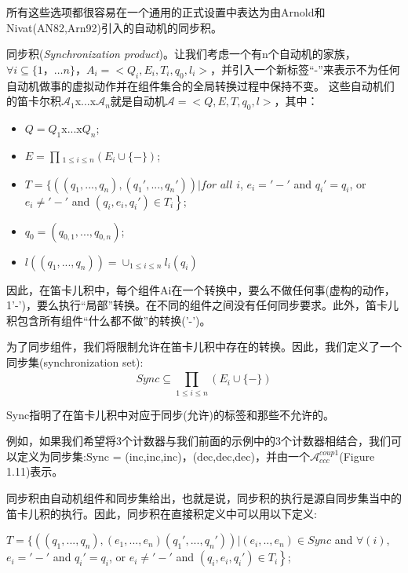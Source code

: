 \documentclass{book}
\begin{document}
    所有这些选项都很容易在一个通用的正式设置中表达为由Arnold和Nivat(AN82,Arn92)引入的自动机的同步积。

    同步积({\itshape Synchronization product})。让我们考虑一个有n个自动机的家族，$\forall{i}\subseteq\{ 1，…n\}$，$ A_i=<Q_i, E_i, T_i, q_0, l_i>$，并引入一个新标签“-”来表示不为任何自动机做事的虚拟动作并在组件集合的全局转换过程中保持不变。
    这些自动机们的笛卡尔积$\mathcal{A}_1$x...x$\mathcal{A}_n$就是自动机$\mathcal{A} =<Q,E,T,q_0,l>$，其中：
    \begin{itemize}
      \item $Q=Q_1$x...x$Q_n$;
      \item $E=\prod_{}{}_{1\leq i \leq n}(E_i\cup\{-\})$;
      \item $T=\left.\{ ((q_1,...,q_n),(q_1',...,q_n')) |  for\right.$ $all$ $i$, $e_i='-'$ and $q_i'=q_i$, or $e_i\neq '-'$ and $(q_i,e_i,q_i')\in T_i \left.\right\} $;
      \item $q_0=(q_{0,1},...,q_{0,n})$;
      \item $l((q_1,...,q_n))=\cup _{1\leq i \leq n}l_i(q_i)$
    \end{itemize}

    因此，在笛卡儿积中，每个组件Ai在一个转换中，要么不做任何事(虚构的动作，1'-')，要么执行“局部”转换。在不同的组件之间没有任何同步要求。此外，笛卡儿积包含所有组件“什么都不做”的转换('-')。

    为了同步组件，我们将限制允许在笛卡儿积中存在的转换。因此，我们定义了一个同步集(synchronization set):
    \begin{equation*}
      Sync \subseteq \prod_{1\leq i \leq n}^{}(E_i\cup\{-\})
    \end{equation*}

    Sync指明了在笛卡儿积中对应于同步(允许)的标签和那些不允许的。

    例如，如果我们希望将3个计数器与我们前面的示例中的3个计数器相结合，我们可以定义为同步集:Sync = {(inc,inc,inc)，(dec,dec,dec)}，并由一个$\mathcal{A}_{ccc}^{coup1}$(Figure 1.11)表示。





    同步积由自动机组件和同步集给出，也就是说，同步积的执行是源自同步集当中的笛卡儿积的执行。因此，同步积在直接积定义中可以用以下定义:

    $T=\left.\{ ((q_1,...,q_n),(e_1,...,e_n)(q_1',...,q_n')) | (e_i,..,e_n)\in Sync \right.$ and $\forall(i)$, $e_i='-'$ and $q_i'=q_i$, or $e_i\neq '-'$ and $(q_i,e_i,q_i')\in T_i \left.\right\} $;
\end{document}
